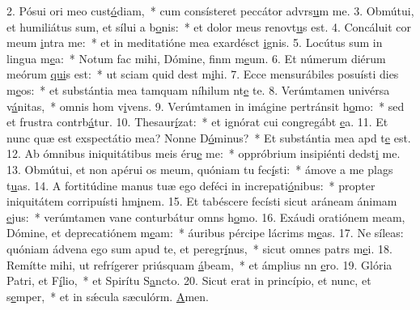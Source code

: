 2. Pósui ori meo cust\uline{ó}diam,~* cum consísteret peccátor advrs\uline{u}m me.
3. Obmútui, et humiliátus sum, et sílui a b\uline{o}nis:~* et dolor meus renovt\uline{u}s est.
4. Concáluit cor meum \uline{i}ntra me:~* et in meditatióne mea exardésct \uline{i}gnis.
5. Locútus sum in lingua m\uline{e}a:~* Notum fac mihi, Dómine, finm m\uline{e}um.
6. Et númerum diérum meórum \uline{qui}s est:~* ut sciam quid dest m\uline{i}hi.
7. Ecce mensurábiles posuísti dies m\uline{e}os:~* et substántia mea tamquam níhilum nt\uline{e} te.
8. Verúmtamen univérsa v\uline{á}nitas,~* omnis hom v\uline{i}vens.
9. Verúmtamen in imágine pertránsit h\uline{o}mo:~* sed et frustra contrb\uline{á}tur.
10. Thesaur\uline{í}zat:~* et ignórat cui congregábt \uline{e}a.
11. Et nunc quæ est exspectátio mea? Nonne D\uline{ó}minus?~* Et substántia mea apd t\uline{e} est.
12. Ab ómnibus iniquitátibus meis éru\uline{e} me:~* oppróbrium insipiénti dedst\uline{i} me.
13. Obmútui, et non apérui os meum, quóniam tu fec\uline{í}sti:~* ámove a me plags t\uline{u}as.
14. A fortitúdine manus tuæ ego deféci in increpati\uline{ó}nibus:~* propter iniquitátem corripuísti hm\uline{i}nem.
15. Et tabéscere fecísti sicut aráneam ánimam \uline{e}jus:~* verúmtamen vane conturbátur omns h\uline{o}mo.
16. Exáudi oratiónem meam, Dómine, et deprecatiónem m\uline{e}am:~* áuribus pércipe lácrims m\uline{e}as.
17. Ne síleas: quóniam ádvena ego sum apud te, et peregr\uline{í}nus,~* sicut omnes patrs m\uline{e}i.
18. Remítte mihi, ut refrígerer priúsquam \uline{á}beam,~* et ámplius nn \uline{e}ro.
19. Glória Patri, et F\uline{í}lio,~* et Spirítu S\uline{a}ncto.
20. Sicut erat in princípio, et nunc, et s\uline{e}mper,~* et in sǽcula sæculórm. \uline{A}men.
